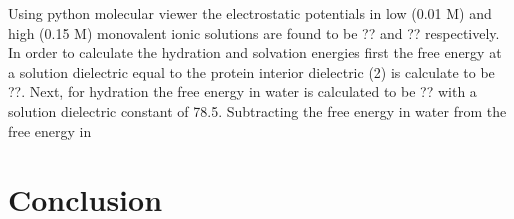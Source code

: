 \documentclass[12pt]{article}
\begin{document}
Using python molecular viewer the electrostatic potentials in low (0.01 M) and high (0.15 M) monovalent ionic solutions are found to be ?? and ?? respectively. In order to calculate the hydration and solvation energies first the free energy at a solution dielectric equal to the protein interior dielectric (2) is calculate to be ??. Next, for hydration the free energy in water is calculated to be ?? with a solution dielectric constant of 78.5. Subtracting the free energy in water from the free energy in 



\section{Conclusion}


%
%
\end{document}
